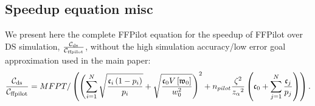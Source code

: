\continuesupplemental

\subsection{Speedup equation misc}
We present here the complete FFPilot equation for the speedup of FFPilot over DS simulation, $\frac{{\mathcal{C}}_{\textrm{ds}}}{{\mathcal{C}}_{\textrm{ffpilot}}}$, without the high simulation accuracy/low error goal approximation used in the main paper:
    \begin{equation*}
        \frac{{\mathcal{C}}_{\textrm{ds}}}{{\mathcal{C}}_{\textrm{ffpilot}}} = MFPT /\left( \left(\sum _{i=1}^N \sqrt{\frac{\mathfrak{c}_{i} \left( 1-p_{i} \right)}{p_{i}}}+\sqrt{\frac{\mathfrak{c}_{0} V \left[ \mathfrak{w}_{0} \right]}{w_0^2}}\right)^2 + n_{pilot} \frac{\zeta {}^2}{z_{\alpha} {}^2} \left( \mathfrak{c}_{0} + \sum _{j=1}^N \frac{\mathfrak{c}_{j}}{p_j} \right) \right).
	\end{equation*}
